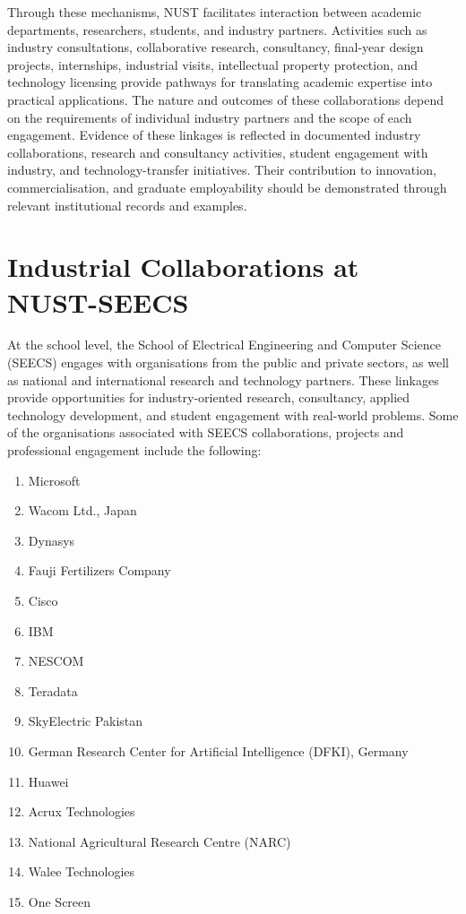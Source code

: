 Through these mechanisms, NUST facilitates interaction between
academic departments, researchers, students, and industry partners.
Activities such as industry consultations, collaborative research,
consultancy, final-year design projects, internships, industrial
visits, intellectual property protection, and technology licensing
provide pathways for translating academic expertise into practical
applications. The nature and outcomes of these collaborations
depend on the requirements of individual industry partners and
the scope of each engagement. Evidence of these linkages is reflected in documented industry
collaborations, research and consultancy activities, student
engagement with industry, and technology-transfer initiatives.
Their contribution to innovation, commercialisation, and graduate
employability should be demonstrated through relevant institutional
records and examples.

\section{Industrial Collaborations at NUST-SEECS}

At the school level, the School of Electrical Engineering and
Computer Science (SEECS) engages with organisations from the public
and private sectors, as well as national and international research
and technology partners. These linkages provide opportunities for
industry-oriented research, consultancy, applied technology
development, and student engagement with real-world problems.
Some of the organisations associated with SEECS collaborations, projects and professional engagement include the following:

\begin{enumerate}[noitemsep, topsep=0pt]
    \item Microsoft
    \item Wacom Ltd., Japan
    \item Dynasys
    \item Fauji Fertilizers Company
    \item Cisco
    \item IBM
    \item NESCOM
    \item Teradata
    \item SkyElectric Pakistan
    \item German Research Center for Artificial Intelligence (DFKI),
          Germany
    \item Huawei
    \item Acrux Technologies
    \item National Agricultural Research Centre (NARC)
    \item Walee Technologies
    \item One Screen
\end{enumerate}

